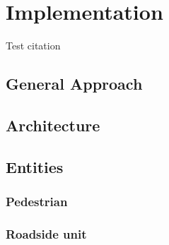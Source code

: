 \chapter{Implementation}
\label{cha:Implementation}

Test citation \cite{Diewald2012MobileCommunication}

\section{General Approach}

\section{Architecture}

\section{Entities}

\subsection{Pedestrian}

\subsection{Roadside unit}